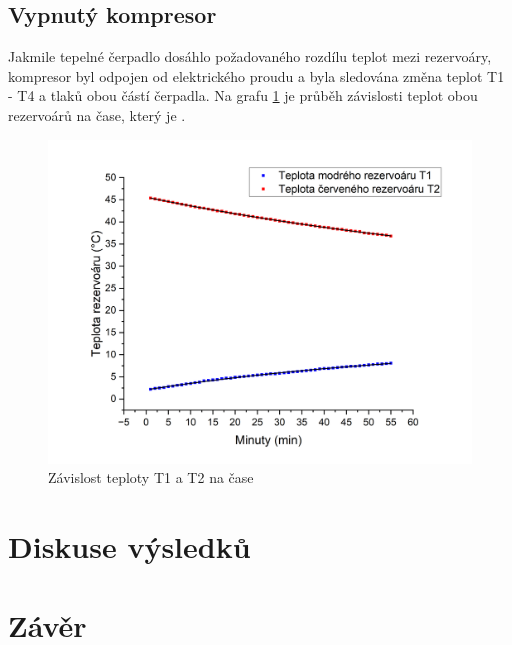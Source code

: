 \subsection{Vypnutý kompresor}

Jakmile tepelné čerpadlo dosáhlo požadovaného rozdílu teplot mezi rezervoáry, kompresor byl odpojen od elektrického proudu a byla sledována změna teplot T1 - T4 a tlaků obou částí čerpadla. Na grafu \ref{fig:T1(t),T2(t)-vyp} je průběh závislosti teplot obou rezervoárů na čase, který je .

\begin{figure}[h]
    \centering
    \includegraphics[width=0.68\linewidth]{27 - Tepelné čerpadlo//Protokol_tepelné čerpadlo//img/T1(t), T2(t) vyp.png}
    \caption{Závislost teploty T1 a T2 na čase}
    \label{fig:T1(t),T2(t)-vyp}
\end{figure}
    
\section{Diskuse výsledků}

\section{Závěr}
